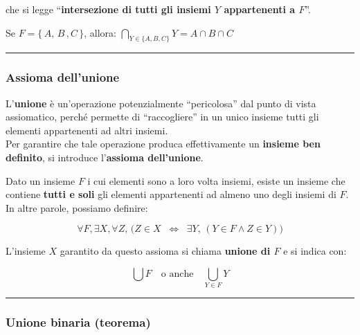 \documentclass[
  a4paper,
]{article}
\begin{document}
che si legge ``\textbf{intersezione di tutti gli insiemi \(Y\)
appartenenti a \(F\)}''.

\begin{examplebox}

Se \(F = \{ \,A,\, B\, ,C\, \}\), allora:
\(\bigcap_{Y \in \{A, B, C\}} Y = A \cap B \cap C\)

\end{examplebox}

\par\noindent\rule{\linewidth}{0.4pt}\par\vspace{6pt}

\hypertarget{assioma-dellunione}{%
\subsubsection{Assioma dell'unione}\label{assioma-dellunione}}

L'\textbf{unione} è un'operazione potenzialmente ``pericolosa'' dal
punto di vista assiomatico, perché permette di ``raccogliere'' in un
unico insieme tutti gli elementi appartenenti ad altri insiemi.\\
Per garantire che tale operazione produca effettivamente un
\textbf{insieme ben definito}, si introduce l'\textbf{assioma
dell'unione}.

Dato un insieme \(F\) i cui elementi sono a loro volta insiemi, esiste
un insieme che contiene \textbf{tutti e soli} gli elementi appartenenti
ad almeno uno degli insiemi di \(F\). In altre parole, possiamo
definire:

\[
\forall F, \exists X, \forall Z, \, \big( Z \in X \;\;\Longleftrightarrow\;\; \exists Y, \, (Y \in F \land Z \in Y) \big)
\]

L'insieme \(X\) garantito da questo assioma si chiama \textbf{unione di
\(F\)} e si indica con:

\[
\bigcup F \quad \text{o anche} \quad \bigcup_{Y \in F} Y
\]

\par\noindent\rule{\linewidth}{0.4pt}\par\vspace{6pt}

\hypertarget{unione-binaria-teorema}{%
\subsubsection{Unione binaria (teorema)}\label{unione-binaria-teorema}}
\end{document}
